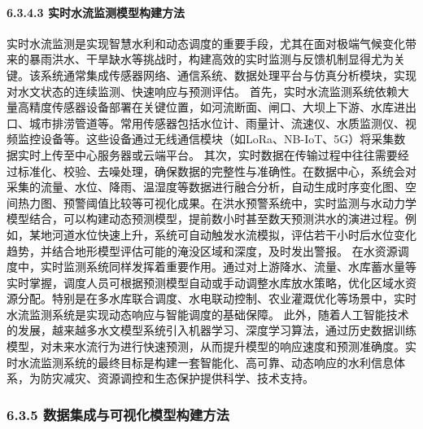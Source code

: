 \paragraph{6.3.4.3 实时水流监测模型构建方法}\label{ux5b9eux65f6ux6c34ux6d41ux76d1ux6d4bux6a21ux578bux6784ux5efaux65b9ux6cd5}
实时水流监测是实现智慧水利和动态调度的重要手段，尤其在面对极端气候变化带来的暴雨洪水、干旱缺水等挑战时，构建高效的实时监测与反馈机制显得尤为关键。该系统通常集成传感器网络、通信系统、数据处理平台与仿真分析模块，实现对水文状态的连续监测、快速响应与预测评估。
首先，实时水流监测系统依赖大量高精度传感器设备部署在关键位置，如河流断面、闸口、大坝上下游、水库进出口、城市排涝管道等。常用传感器包括水位计、雨量计、流速仪、水质监测仪、视频监控设备等。这些设备通过无线通信模块（如LoRa、NB-IoT、5G）将采集数据实时上传至中心服务器或云端平台。
其次，实时数据在传输过程中往往需要经过标准化、校验、去噪处理，确保数据的完整性与准确性。在数据中心，系统会对采集的流量、水位、降雨、温湿度等数据进行融合分析，自动生成时序变化图、空间热力图、预警阈值比较等可视化成果。在洪水预警系统中，实时监测与水动力学模型结合，可以构建动态预测模型，提前数小时甚至数天预测洪水的演进过程。例如，某地河道水位快速上升，系统可自动触发水流模拟，评估若干小时后水位变化趋势，并结合地形模型评估可能的淹没区域和深度，及时发出警报。
在水资源调度中，实时监测系统同样发挥着重要作用。通过对上游降水、流量、水库蓄水量等实时掌握，调度人员可根据预测模型自动或手动调整水库放水策略，优化区域水资源分配。特别是在多水库联合调度、水电联动控制、农业灌溉优化等场景中，实时水流监测系统是实现动态响应与智能调度的基础保障。
此外，随着人工智能技术的发展，越来越多水文模型系统引入机器学习、深度学习算法，通过历史数据训练模型，对未来水流行为进行快速预测，从而提升模型的响应速度和预测准确度。实时水流监测系统的最终目标是构建一套智能化、高可靠、动态响应的水利信息体系，为防灾减灾、资源调控和生态保护提供科学、技术支持。
\subsubsection{6.3.5
数据集成与可视化模型构建方法}\label{ux6570ux636eux96c6ux6210ux4e0eux53efux89c6ux5316ux6a21ux578bux6784ux5efaux65b9ux6cd5}
